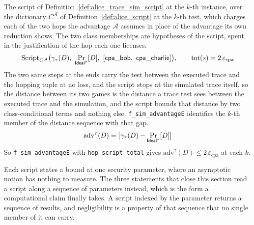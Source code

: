 \begin{definition}
  \label{def:alice_sim_script}
  \rocqok
  The script of Definition~\ref{def:alice_trace_sim_script} at the $k$-th
  instance, over the dictionary $C^{\mathcal{A}}$ of
  Definition~\ref{def:alice_script} at the $k$-th test, which charges each of
  the two hops the advantage $\mathcal{A}$ assumes in place of the advantage
  its own reduction shows. The two class memberships are hypotheses of the
  script, spent in the justification of the hop each one licenses.
  \[ \mathrm{Script}_{C^{\mathcal{A}}}\big(\gamma_\tau(D),\
       \Pr_{\mathsf{Ideal}^\tau}[D],\
       [\mathsf{cpa\_bob},\ \mathsf{cpa\_charlie}]\big),
     \qquad \mathrm{tot}(s) = 2\,\varepsilon_{\mathrm{cpa}} \]
  The two $\mathrm{same}$ steps at the ends carry the test between the
  executed trace and the hopping tuple at no loss, and the script stops at the
  simulated trace itself, so the distance between its two games is the
  distance a trace test sees between the executed trace and the simulation,
  and the script bounds that distance by two class-conditional terms and
  nothing else. \texttt{f\_sim\_advantageE} identifies the $k$-th member of the
  distance sequence with that gap.
  \[ \mathrm{adv}^\tau(D)
       = \big\lvert \gamma_\tau(D) - \Pr_{\mathsf{Ideal}^\tau}[D] \big\rvert \]
  So \texttt{f\_sim\_advantageE} with \texttt{hop\_script\_total} gives
  $\mathrm{adv}^\tau(D) \le 2\,\varepsilon_{\mathrm{cpa}}$ at each $k$.
\end{definition}

Each script states a bound at one security parameter, where an asymptotic
notion has nothing to measure. The three statements that close this section
read a script along a sequence of parameters instead, which is the form a
computational claim finally takes. A script indexed by the parameter returns a
sequence of results, and negligibility is a property of that sequence that no
single member of it can carry.

